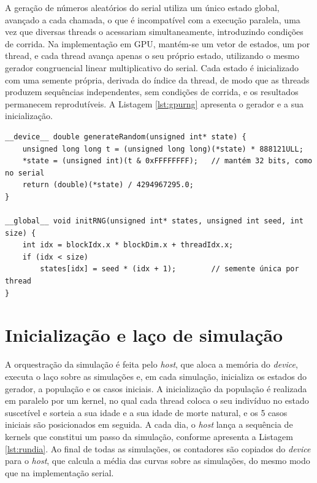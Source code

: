 \documentclass[
	12pt,				%
	openright,			%
	oneside,			%
	a4paper,			%
	english,			%
	french,				%
	spanish,			%
	brazil				%
	]{abntex2}
\begin{document}
A geração de números aleatórios do serial utiliza um único estado global, avançado a cada chamada, o que é incompatível com a execução paralela, uma vez que diversas threads o acessariam simultaneamente, introduzindo condições de corrida. Na implementação em GPU, mantém-se um vetor de estados, um por thread, e cada thread avança apenas o seu próprio estado, utilizando o mesmo gerador congruencial linear multiplicativo do serial. Cada estado é inicializado com uma semente própria, derivada do índice da thread, de modo que as threads produzem sequências independentes, sem condições de corrida, e os resultados permanecem reprodutíveis. A Listagem \ref{lst:gpurng} apresenta o gerador e a sua inicialização.

\begin{lstlisting}[caption={Gerador de números aleatórios por thread.}, label={lst:gpurng}]
__device__ double generateRandom(unsigned int* state) {
    unsigned long long t = (unsigned long long)(*state) * 888121ULL;
    *state = (unsigned int)(t & 0xFFFFFFFF);   // mantém 32 bits, como no serial
    return (double)(*state) / 4294967295.0;
}

__global__ void initRNG(unsigned int* states, unsigned int seed, int size) {
    int idx = blockIdx.x * blockDim.x + threadIdx.x;
    if (idx < size)
        states[idx] = seed * (idx + 1);        // semente única por thread
}
\end{lstlisting}

\section{Inicialização e laço de simulação}

A orquestração da simulação é feita pelo \textit{host}, que aloca a memória do \textit{device}, executa o laço sobre as simulações e, em cada simulação, inicializa os estados do gerador, a população e os casos iniciais. A inicialização da população é realizada em paralelo por um kernel, no qual cada thread coloca o seu indivíduo no estado suscetível e sorteia a sua idade e a sua idade de morte natural, e os 5 casos iniciais são posicionados em seguida. A cada dia, o \textit{host} lança a sequência de kernels que constitui um passo da simulação, conforme apresenta a Listagem \ref{lst:rundia}. Ao final de todas as simulações, os contadores são copiados do \textit{device} para o \textit{host}, que calcula a média das curvas sobre as simulações, do mesmo modo que na implementação serial.
\end{document}
